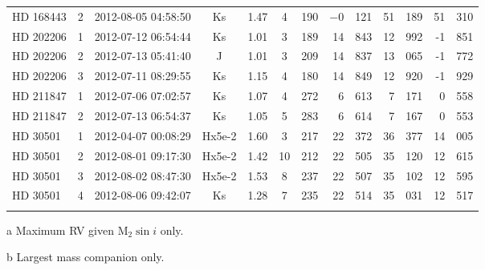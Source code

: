 \begin{table*}
\begin{threeparttable}[b]
\begin{tabular}{l c c c c c c r@{.}l r@{.}l r@{.}l}
                {HD 168443} & 2 & 2012-08-05 04:58:50 & Ks     		& 1.47 		& 4 & 190 & $-$0   & 121 & 51 & 189 \tnote{a,b} & 51&310\tnote{a,b} \\ %
                {HD 202206} & 1 & 2012-07-12 06:54:44 & Ks     		& 1.01 		& 3& 189 & 14      & 843 & 12 & 992\tnote{b}  & -1&851 \\ %
                {HD 202206} & 2 & 2012-07-13 05:41:40 & J       	  & 1.01 	  & 3 & 209 & 14      & 837 & 13 & 065\tnote{b}  & -1&772 \\ %
                {HD 202206} & 3 & 2012-07-11 08:29:55 & Ks     		& 1.15		& 4& 180 & 14      & 849 & 12 & 920\tnote{b}  & -1&929 \\ %
                {HD 211847} & 1 & 2012-07-06 07:02:57 & Ks     		& 1.07 		& 4& 272 & 6        & 613 & 7   & 171 & 0& 558\\ %
                {HD 211847} & 2 & 2012-07-13 06:54:37 & Ks     		& 1.05 		& 5& 283 & 6        & 614 & 7   & 167 & 0&553 \\ %
                {HD 30501}  & 1 & 2012-04-07 00:08:29 & Hx5e-2 	 & 1.60 	 & 3& 217 & 22      &  372 & 36 & 377 & 14&005 \\ %
                {HD 30501}  & 2 & 2012-08-01 09:17:30 & Hx5e-2    & 1.42     & 10& 212 & 22      & 505 & 35  & 120 & 12&615 \\ %
                {HD 30501}  & 3 & 2012-08-02 08:47:30 & Hx5e-2 	 & 1.53 	 & 8& 237 & 22      & 507 &  35 & 102 & 12&595 \\ %
                {HD 30501}  & 4 & 2012-08-06 09:42:07 & Ks     		 & 1.28 	 & 7& 235& 22      & 514 & 35 & 031 & 12&517 \\ %
                \bottomrule
                & & & & 
        \end{tabular}
        \label{tab:observations}
        \begin{tablenotes}
          \item  [a]{Maximum RV given \(\textrm{M}_2\sin{i}\) only.}
          \item  [b]{Largest mass companion only.}
        \end{tablenotes}
    \end{threeparttable}

\end{table*}